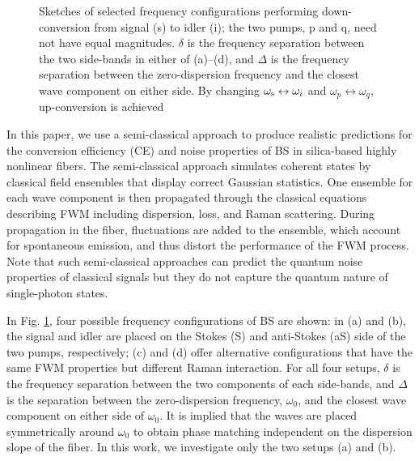 \documentclass[10pt,letterpaper]{article}
\begin{document}
\begin{figure}[!b]
\caption{Sketches of selected frequency configurations performing down-conversion from signal (s) to idler (i); the two pumps, p and q, need not have equal magnitudes. $\delta$ is the frequency separation between the two side-bands in either of (a)--(d), and $\Delta$ is the frequency separation between the zero-dispersion frequency and the closest wave component on either side. By changing $\omega_{\rm s} \leftrightarrow \omega_{i}$ and $\omega_{p} \leftrightarrow\omega_{q}$, up-conversion is achieved} \label{fig_1}
\end{figure}

In this paper, we use a semi-classical approach \cite{Friis_2013} to produce realistic predictions for the conversion efficiency (CE) and noise properties of BS in silica-based highly nonlinear fibers. The semi-classical approach simulates coherent states by classical field ensembles that display correct Gaussian statistics. One ensemble for each wave component is then propagated through the classical equations describing FWM including dispersion, loss, and Raman scattering. During propagation in the fiber, fluctuations are added to the ensemble, which account for spontaneous emission, and thus distort the performance of the FWM process. Note that such semi-classical approaches can predict the quantum noise properties of classical signals but they do not capture the quantum nature of single-photon states.

In Fig. \ref{fig_1}, four possible frequency configurations of BS are shown: in (a) and (b), the signal and idler are placed on the Stokes (S) and anti-Stokes (aS) side of the two pumps, respectively; (c) and (d) offer alternative configurations that have the same FWM properties but different Raman interaction. For all four setups, $\delta$ is the frequency separation between the two components of each side-bands, and $\Delta$ is the separation between the zero-dispersion frequency, $\omega_0$, and the closest wave component on either side of $\omega_0$. It is implied that the waves are placed symmetrically around $\omega_0$ to obtain phase matching independent on the dispersion slope of the fiber. In this work, we investigate only the two setups (a) and (b).
\end{document}
